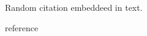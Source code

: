 \documentclass{article}
\begin{document}
Random citation \cite{hossain2022complexities, chen2020detecting} embeddeed in text.

\cite{suicide_watch_dataset} reference

\newpage

 
\end{document}
